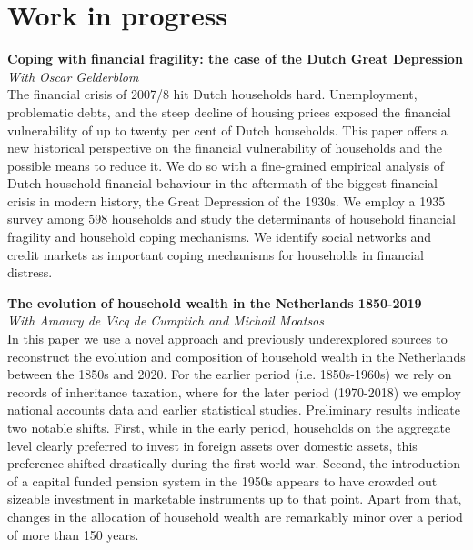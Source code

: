 \documentclass[9pt]{article}
\begin{document}
\vspace{-5pt}\section*{Work in progress}\vspace{-7pt}	
\noindent \textbf{Coping with financial fragility: the case of the Dutch Great Depression} \\
\noindent\textit{With Oscar Gelderblom} \\
The financial crisis of 2007/8 hit Dutch households hard. Unemployment, problematic debts, and the steep decline of housing prices exposed the financial vulnerability of up to twenty per cent of Dutch households. This paper offers a new historical perspective on the financial vulnerability of households and the possible means to reduce it. We do so with a fine-grained empirical analysis of Dutch household financial behaviour in the aftermath of the biggest financial crisis in modern history, the Great Depression of the 1930s. We employ a 1935 survey among 598 households and study the determinants of household financial fragility and household coping mechanisms. We identify social networks and credit markets as important coping mechanisms for households in financial distress.\\ \vspace{-5pt}	

\noindent \textbf{The evolution of household wealth in the Netherlands 1850-2019} \\
\noindent\textit{With Amaury de Vicq de Cumptich and Michail Moatsos} \\
In this paper we use a novel approach and previously underexplored sources to reconstruct the evolution and composition of household wealth in the Netherlands between the 1850s and 2020. For the earlier period (i.e. 1850s-1960s) we rely on records of inheritance taxation, where for the later period (1970-2018) we employ national accounts data and earlier statistical studies. 
Preliminary results indicate two notable shifts. First, while in the early period, households on the aggregate level clearly preferred to invest in foreign assets over domestic assets, this preference shifted drastically during the first world war. Second, the introduction of a capital funded pension system in the 1950s appears to have crowded out sizeable investment in marketable instruments up to that point. Apart from that, changes in the allocation of household wealth are remarkably minor over a period of more than 150 years. \vspace{-5pt}	
\end{document}
